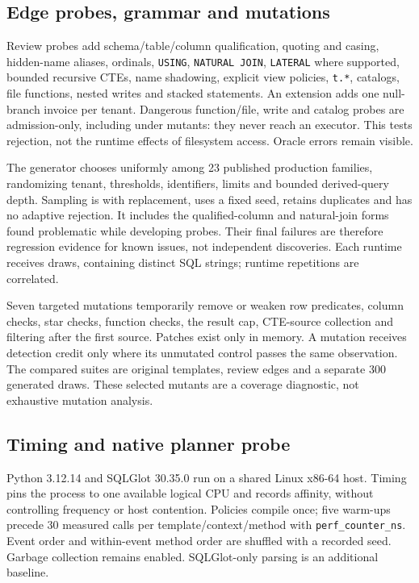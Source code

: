 \documentclass[sigconf,nonacm,natbib=false]{acmart}
\begin{document}
\subsection{Edge probes, grammar and mutations}
Review probes add schema/table/column qualification, quoting and casing,
hidden-name aliases, ordinals, \texttt{USING}, \texttt{NATURAL JOIN},
\texttt{LATERAL} where supported, bounded recursive CTEs, name shadowing,
explicit view policies, \texttt{t.*}, catalogs, file functions, nested writes
and stacked statements. An extension adds one null-branch invoice per tenant.
Dangerous function/file, write and catalog probes are admission-only, including
under mutants: they never reach an executor. This tests rejection, not the
runtime effects of filesystem access. Oracle errors remain visible.

The generator chooses uniformly among 23 published production families,
randomizing tenant, thresholds, identifiers, limits and bounded derived-query
depth. Sampling is with replacement, uses a fixed seed, retains duplicates
and has no adaptive rejection. It includes the qualified-column and natural-join
forms found problematic while developing probes. Their final failures are
therefore regression evidence for known issues, not independent discoveries.
Each runtime receives \FuzzDraws{} draws, containing \FuzzUnique{} distinct
SQL strings; runtime repetitions are correlated.

Seven targeted mutations temporarily remove or weaken row predicates, column
checks, star checks, function checks, the result cap, CTE-source collection
and filtering after the first source. Patches exist only in memory. A
mutation receives detection credit only where its unmutated control passes
the same observation. The compared suites are original templates, review
edges and a separate 300 generated draws. These selected mutants are a
coverage diagnostic, not exhaustive mutation analysis.

\subsection{Timing and native planner probe}
Python 3.12.14 and SQLGlot 30.35.0 run on a shared Linux x86-64 host. Timing
pins the process to one available logical CPU and records affinity, without
controlling frequency or host contention. Policies compile once; five warm-ups
precede 30 measured calls per template/context/method with
\texttt{perf\_counter\_ns}. Event order and within-event method order are
shuffled with a recorded seed. Garbage collection remains enabled. SQLGlot-only
parsing is an additional baseline.
\end{document}
